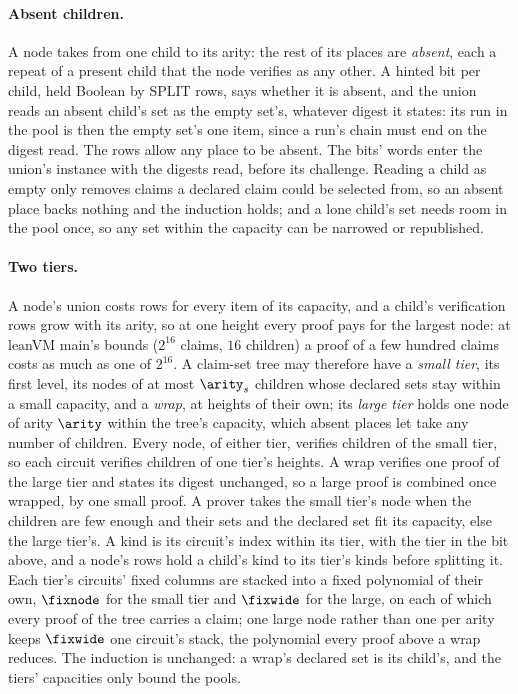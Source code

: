\paragraph{Absent children.} A node takes from one child to its arity: the rest of its places are \emph{absent}, each a repeat of a present child that the node verifies as any other. A hinted bit per child, held Boolean by \textsf{SPLIT} rows, says whether it is absent, and the union reads an absent child's set as the empty set's, whatever digest it states: its run in the pool is then the empty set's one item, since a run's chain must end on the digest read. The rows allow any place to be absent. The bits' words enter the union's instance with the digests read, before its challenge. Reading a child as empty only removes claims a declared claim could be selected from, so an absent place backs nothing and the induction holds; and a lone child's set needs room in the pool once, so any set within the capacity can be narrowed or republished.

\paragraph{Two tiers.} A node's union costs rows for every item of its capacity, and a child's verification rows grow with its arity, so at one height every proof pays for the largest node: at leanVM main's bounds ($2^{16}$ claims, $16$ children) a proof of a few hundred claims costs as much as one of $2^{16}$. A claim-set tree may therefore have a \emph{small tier}, its first level, its nodes of at most $\arity_s$ children whose declared sets stay within a small capacity, and a \emph{wrap}, at heights of their own; its \emph{large tier} holds one node of arity $\arity$ within the tree's capacity, which absent places let take any number of children. Every node, of either tier, verifies children of the small tier, so each circuit verifies children of one tier's heights. A wrap verifies one proof of the large tier and states its digest unchanged, so a large proof is combined once wrapped, by one small proof. A prover takes the small tier's node when the children are few enough and their sets and the declared set fit its capacity, else the large tier's. A kind is its circuit's index within its tier, with the tier in the bit above, and a node's rows hold a child's kind to its tier's kinds before splitting it. Each tier's circuits' fixed columns are stacked into a fixed polynomial of their own, $\fixnode$ for the small tier and $\fixwide$ for the large, on each of which every proof of the tree carries a claim; one large node rather than one per arity keeps $\fixwide$ one circuit's stack, the polynomial every proof above a wrap reduces. The induction is unchanged: a wrap's declared set is its child's, and the tiers' capacities only bound the pools.

